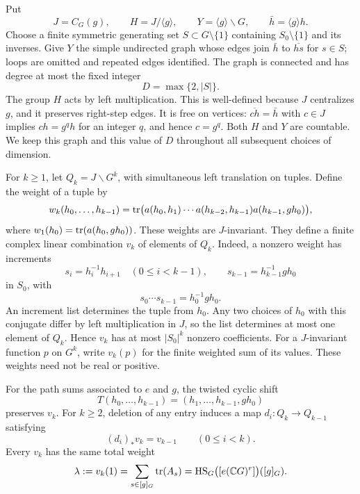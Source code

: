 Put
\[
 J=C_G(g),\qquad H=J/\langle g\rangle,\qquad
 Y=\langle g\rangle\backslash G,
 \qquad \bar h=\langle g\rangle h.
\]
Choose a finite symmetric generating set $S\subset G\setminus\{1\}$
containing $S_0\setminus\{1\}$ and its inverses.  Give $Y$ the simple
undirected graph whose edges join $\bar h$ to $\overline{hs}$ for $s\in S$;
loops are omitted and repeated edges identified.  The graph is connected
and has degree at most the fixed integer
\[
 D=\max\{2,|S|\}.
\]
The group $H$ acts by left multiplication.  This is well-defined because
$J$ centralizes $g$, and it preserves right-step edges.  It is free on
vertices: $\overline{ch}=\bar h$ with $c\in J$ implies $ch=g^q h$ for an
integer $q$, and hence $c=g^q$.  Both $H$ and $Y$ are countable.  We keep
this graph and this value of $D$ throughout all subsequent choices of
dimension.

For $k\ge1$, let $Q_k=J\backslash G^k$, with simultaneous left
translation on tuples.  Define the weight of a tuple by
\begin{equation}\label{eq:path-weight}
 w_k(h_0,\ldots,h_{k-1})
 =\operatorname{tr}\bigl(a(h_0,h_1)\cdots
 a(h_{k-2},h_{k-1})a(h_{k-1},gh_0)\bigr),
\end{equation}
where $w_1(h_0)=\operatorname{tr}(a(h_0,gh_0))$.  These weights are $J$-invariant.
They define a finite complex linear combination $v_k$ of elements of
$Q_k$.  Indeed, a nonzero weight has increments
\[
 s_i=h_i^{-1}h_{i+1}\quad(0\le i<k-1),\qquad
 s_{k-1}=h_{k-1}^{-1}gh_0
\]
in $S_0$, with
\[
 s_0\cdots s_{k-1}=h_0^{-1}gh_0.
\]
An increment list determines the tuple from $h_0$.  Any two choices of
$h_0$ with this conjugate differ by left multiplication in $J$, so the
list determines at most one element of $Q_k$.  Hence $v_k$ has at most
$|S_0|^k$ nonzero coefficients.  For a $J$-invariant function $p$ on
$G^k$, write $v_k(p)$ for the finite weighted sum of its values.  These
weights need not be real or positive.

\begin{lemma}\label{lem:path-identities}
For the path sums associated to $e$ and $g$, the twisted cyclic shift
\[
 T(h_0,\ldots,h_{k-1})=(h_1,\ldots,h_{k-1},gh_0)
\]
preserves $v_k$.  For $k\ge2$, deletion of any entry induces a map
$d_i:Q_k\to Q_{k-1}$ satisfying
\[
 (d_i)_*v_k=v_{k-1}\qquad(0\le i<k).
\]
Every $v_k$ has the same total weight
\begin{equation}\label{eq:trace-coefficient}
 \lambda:=v_k(1)
 =\sum_{s\in[g]_G}\operatorname{tr}(A_s)
 =\operatorname{HS}_G\bigl([e(\mathbb C G)^r]\bigr)([g]_G).
\end{equation}
\end{lemma}

